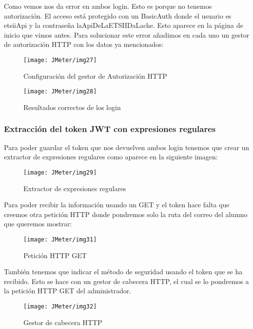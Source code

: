 Como vemos nos da error en ambos login. Esto es porque no tenemos autorización. El acceso está protegido con un BasicAuth donde el usuario es etsiiApi y la contraseña laApiDeLaETSIIDaLache. Esto aparece en la página de inicio que vimos antes.
Para solucionar este error añadimos en cada uno un gestor de autorización  HTTP con los datos ya mencionados:

\begin{figure}[H]
    \centering
    \texttt{[image: JMeter/img27]}
    \caption{Configuración del gestor de Autorización HTTP}
\end{figure}

\begin{figure}[H]
    \centering
    \texttt{[image: JMeter/img28]}
    \caption{Resultados correctos de los login}
\end{figure}

\subsubsection{Extracción del token JWT con expresiones regulares}

Para poder guardar el token que nos devuelven ambos login tenemos que crear un extractor de expresiones regulares como aparece en la siguiente imagen:

\begin{figure}[H]
    \centering
    \texttt{[image: JMeter/img29]}
    \caption{Extractor de expresiones regulares}
\end{figure}

Para poder recibir la información usando un GET y el token hace falta que creemos otra petición HTTP donde pondremos solo la ruta del correo del alumno que queremos mostrar:

\begin{figure}[H]
    \centering
    \texttt{[image: JMeter/img31]}
    \caption{Petición HTTP GET}
\end{figure}

También tenemos que indicar el método de seguridad usando el token que se ha recibido. Esto se hace con un gestor de cabecera HTTP, el cual se lo pondremos a la petición HTTP GET del administrador.

\begin{figure}[H]
    \centering
    \texttt{[image: JMeter/img32]}
    \caption{Gestor de cabecera HTTP}
\end{figure}

